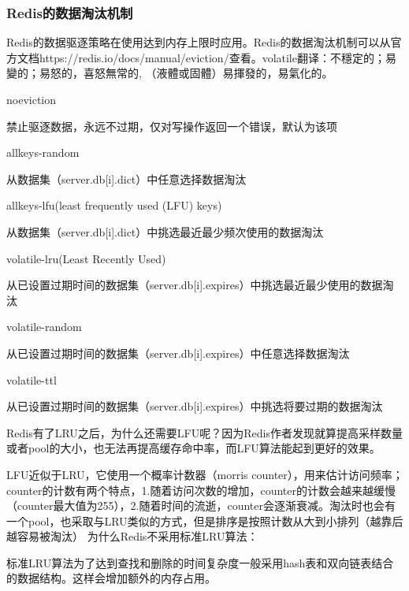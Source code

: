 \documentclass[../../../interview-questions.tex]{subfiles}
\begin{document}
\subsubsection{Redis的数据淘汰机制}

Redis的数据驱逐策略在使用达到内存上限时应用。Redis的数据淘汰机制可以从官方文档https://redis.io/docs/manual/eviction/查看。volatile翻译：不穩定的；易變的；易怒的，喜怒無常的, （液體或固體）易揮發的，易氣化的。

noeviction

禁止驱逐数据，永远不过期，仅对写操作返回一个错误，默认为该项

allkeys-random

从数据集（server.db[i].dict）中任意选择数据淘汰

allkeys-lfu(least frequently used (LFU) keys)

从数据集（server.db[i].dict）中挑选最近最少频次使用的数据淘汰

volatile-lru(Least Recently Used)

从已设置过期时间的数据集（server.db[i].expires）中挑选最近最少使用的数据淘汰

volatile-random

从已设置过期时间的数据集（server.db[i].expires）中任意选择数据淘汰

volatile-ttl

从已设置过期时间的数据集（server.db[i].expires）中挑选将要过期的数据淘汰


Redis有了LRU之后，为什么还需要LFU呢？因为Redis作者发现就算提高采样数量或者pool的大小，也无法再提高缓存命中率，而LFU算法能起到更好的效果。

LFU近似于LRU，它使用一个概率计数器（morris counter），用来估计访问频率；counter的计数有两个特点，1.随着访问次数的增加，counter的计数会越来越缓慢（counter最大值为255），2.随着时间的流逝，counter会逐渐衰减。淘汰时也会有一个pool，也采取与LRU类似的方式，但是排序是按照计数从大到小排列（越靠后越容易被淘汰）
为什么Redis不采用标准LRU算法：

标准LRU算法为了达到查找和删除的时间复杂度一般采用hash表和双向链表结合的数据结构。这样会增加额外的内存占用。
\end{document}
